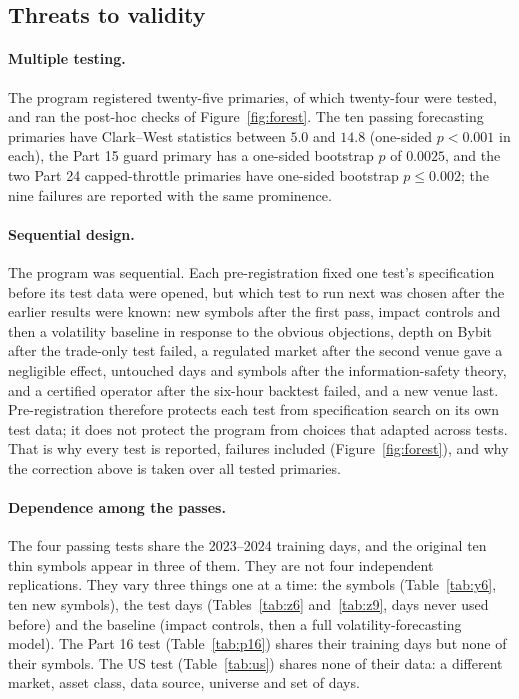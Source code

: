 \subsection{Threats to validity}\label{sec:threats}
\paragraph{Multiple testing.} The program registered twenty-five primaries, of which twenty-four were tested, and ran the post-hoc checks of Figure~\ref{fig:forest}. The ten passing forecasting primaries have Clark--West statistics between $5.0$ and $14.8$ (one-sided $p<0.001$ in each), the Part 15 guard primary has a one-sided bootstrap $p$ of $0.0025$, and the two Part 24 capped-throttle primaries have one-sided bootstrap $p\le 0.002$; the nine failures are reported with the same prominence.

\paragraph{Sequential design.} The program was sequential. Each pre-registration fixed one test's specification before its test data were opened, but which test to run next was chosen after the earlier results were known: new symbols after the first pass, impact controls and then a volatility baseline in response to the obvious objections, depth on Bybit after the trade-only test failed, a regulated market after the second venue gave a negligible effect, untouched days and symbols after the information-safety theory, and a certified operator after the six-hour backtest failed, and a new venue last. Pre-registration therefore protects each test from specification search on its own test data; it does not protect the program from choices that adapted across tests. That is why every test is reported, failures included (Figure~\ref{fig:forest}), and why the correction above is taken over all tested primaries.

\paragraph{Dependence among the passes.} The four passing tests share the 2023--2024 training days, and the original ten thin symbols appear in three of them. They are not four independent replications. They vary three things one at a time: the symbols (Table~\ref{tab:y6}, ten new symbols), the test days (Tables~\ref{tab:z6} and~\ref{tab:z9}, days never used before) and the baseline (impact controls, then a full volatility-forecasting model). The Part 16 test (Table~\ref{tab:p16}) shares their training days but none of their symbols. The US test (Table~\ref{tab:us}) shares none of their data: a different market, asset class, data source, universe and set of days.

